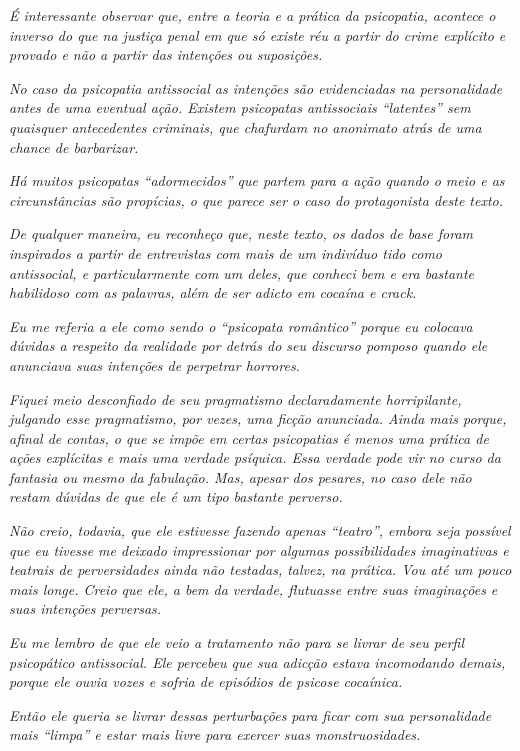 \emph{É interessante observar que, entre a teoria e a prática da
psicopatia, acontece o inverso do que na justiça penal em que só existe
réu a partir do crime explícito e provado e não a partir das intenções
ou suposições.}~

\emph{No caso da psicopatia antissocial as intenções são evidenciadas na
personalidade antes de uma eventual ação. Existem psicopatas
antissociais ``latentes'' sem quaisquer antecedentes criminais, que
chafurdam no anonimato atrás de uma chance de barbarizar.}~

\emph{Há muitos psicopatas ``adormecidos'' que partem para a ação quando
o meio e as circunstâncias são propícias, o que parece ser o caso do
protagonista deste texto.}~

\emph{De qualquer maneira, eu reconheço que, neste texto, os dados de
base foram inspirados a partir de entrevistas com mais de um indivíduo
tido como antissocial, e particularmente com um deles, que conheci bem e
era bastante habilidoso com as palavras, além de ser adicto em cocaína e
crack.}~

\emph{Eu me referia a ele como sendo o ``psicopata romântico'' porque eu
colocava dúvidas a respeito da realidade por detrás do seu discurso
pomposo quando ele anunciava suas intenções de perpetrar horrores.}~

\emph{Fiquei meio desconfiado de seu pragmatismo declaradamente
horripilante, julgando esse pragmatismo, por vezes, uma ficção
anunciada. Ainda mais porque, afinal de contas, o que se impõe em certas
psicopatias é menos uma prática de ações explícitas e mais uma verdade
psíquica. Essa verdade pode vir no curso da fantasia ou mesmo da
fabulação. Mas, apesar dos pesares, no caso dele não restam dúvidas de
que ele é um tipo bastante perverso.}

\emph{Não creio, todavia, que ele estivesse fazendo apenas ``teatro'',
embora seja possível que eu tivesse me deixado impressionar por algumas
possibilidades imaginativas e teatrais de perversidades ainda não
testadas, talvez, na prática. Vou até um pouco mais longe. Creio que
ele, a bem da verdade, flutuasse entre suas imaginações e suas intenções
perversas.}~

\emph{Eu me lembro de que ele veio a tratamento não para se livrar de
seu perfil psicopático antissocial. Ele percebeu que sua adicção estava
incomodando demais, porque ele ouvia vozes e sofria de episódios de
psicose cocaínica.}~

\emph{Então ele queria se livrar dessas perturbações para ficar com sua
personalidade mais ``limpa'' e estar mais livre para exercer suas
monstruosidades.}~

